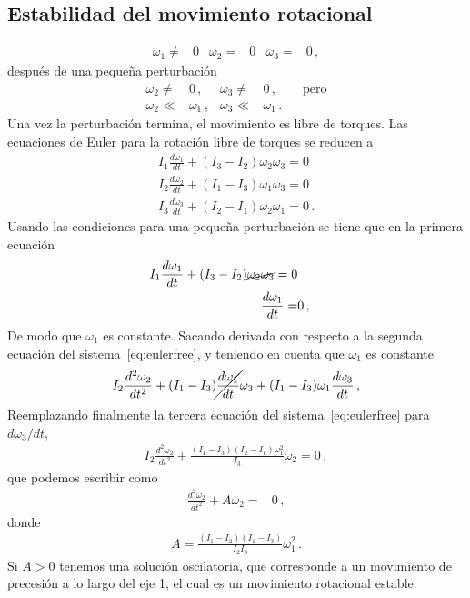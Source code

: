 \subsection{Estabilidad del movimiento rotacional}
\begin{align}
\omega_1\ne& 0&   \omega_2=&0& \omega_3=&0\,,
\end{align}
después de una pequeña perturbación
\begin{align}
\label{eq:condest}
  \omega_2\ne&0\,,&\omega_3\ne&0\,,\qquad\text{pero}\nonumber\\
  \omega_2\ll& \omega_1 \,,&\omega_3\ll &\omega_1\,.
\end{align}
Una vez la perturbación termina, el movimiento es libre de torques. Las ecuaciones de Euler para la rotación libre de torques se reducen a
\begin{align}
\label{eq:eulerfree}
I_1\frac{d\omega_1}{dt}+(I_3-I_2)\omega_2\omega_3=0\nonumber\\
I_2\frac{d\omega_2}{dt}+(I_1-I_3)\omega_1\omega_3=0\nonumber\\
I_3\frac{d\omega_3}{dt}+(I_2-I_1)\omega_2\omega_1=0\,.
\end{align}
Usando las condiciones para una pequeña perturbación se tiene que en la primera ecuación
\begin{align}
I_1\frac{d\omega_1}{dt}+(I_3-I_2)\cancel{\omega_2\omega_3}=0\nonumber\\
\frac{d\omega_1}{dt}=&0\,,
\end{align}
De modo que $\omega_1$ es constante. Sacando derivada con respecto a la segunda ecuación del sistema~\eqref{eq:eulerfree}, y teniendo en cuenta que $\omega_1$ es constante
\begin{align}
  I_2 \frac{d^2\omega_2}{dt^2}+(I_1-I_3)\cancel{\frac{d\omega_1}{dt}}\omega_3+(I_1-I_3)\omega_1\frac{d\omega_3}{dt}\,,
\end{align}
Reemplazando finalmente la tercera ecuación del sistema~\eqref{eq:eulerfree} para $d\omega_3/dt$,
\begin{align}
  I_2 \frac{d^2\omega_2}{dt^2}+\frac{(I_1-I_3)(I_2-I_1)\omega_1^2}{I_3} \omega_2=0\,,
\end{align}
que podemos escribir como
\begin{align}
\label{eq:eulersln}
  \frac{d^2\omega_2}{dt^2}+A\omega_2=&0\,,
\end{align}
donde
\begin{align}
  A=\frac{(I_1-I_2)(I_1-I_3)}{I_2I_3}\omega_1^2\,.
\end{align}
Si $A>0$ tenemos una solución oscilatoria, que corresponde a un movimiento de precesión a lo largo del eje 1, el cual es un movimiento rotacional estable. 

